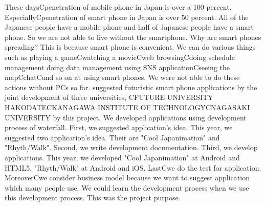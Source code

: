 \begin{eabstract}
These daysCpenetration of mobile phone in Japan is over a 100 percent. EspeciallyCpenetration of smart phone in Japan is over 50 percent. All of the Japanese people have a mobile phone and half of Japanese people have a smart phone. So we are not able to live without the smartphone.
Why are smart phones spreading? This is because smart phone is convenient. We can do various things such as playing a gameCwatching a movieCweb browsingCdoing schedule management doing data management using SNS applicationCseeing the mapCchatCand so on at using smart phones. We were not able to do these actions without PCs so far. 
suggested futuristic smart phone applications by the joint development of three universities, CFUTURE UNIVERSITY HAKODATECKANAGAWA INSTITUTE OF TECHNOLOGYCNAGASAKI UNIVERSITY by this project.
We developed applications using development process of waterfall. First, we suggested application's idea. This year, we suggested two application's idea. Their are "Cool Japanimation" and "Rhyth/Walk". Second, we write development documentation. Third, we develop applications. This year, we developed "Cool Japanimation" at Android and HTML5, "Rhyth/Walk" at Android and iOS. LastCwe do the test for application. MoreoverCwe consider business model because we want to suggest application which many people use. 
We could learn the development process when we use this development process. This was the project purpose. 
\\[5mm]
\end{eabstract}
